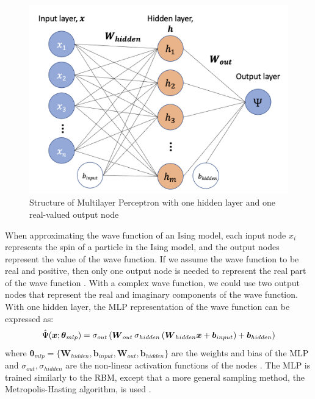 \begin{figure}[htb!]
    \centering
    \includegraphics[width=0.7\linewidth]{images/mlp_diagram.png}
    \caption{Structure of Multilayer Perceptron with one hidden layer and one real-valued output node}
    \label{rbmstructure}
\end{figure}
When approximating the wave function of an Ising model, each input node $x_i$ represents the spin of a particle in the Ising model, and the output nodes represent the value of the wave function. If we assume the wave function to be real and positive, then only one output node is needed to represent the real part of the wave function \cite{b20}. With a complex wave function, we could use two output nodes that represent the real and imaginary components of the wave function. With one hidden layer, the MLP representation of the wave function can be expressed as:
\begin{equation}
    \Hat{\Psi}(\boldsymbol{x}; \boldsymbol{\theta}_{mlp}) = 
    \sigma_{out} \left(
    \boldsymbol{W}_{out} \hspace{2px}
    \sigma_{hidden} \left( \boldsymbol{W}_{hidden}\boldsymbol{x} + \boldsymbol{b}_{input} \right) + \boldsymbol{b}_{hidden} \right)
\end{equation}
where  $\boldsymbol{\theta}_{mlp} = \{\boldsymbol{W}_{hidden}, \boldsymbol{b}_{input}, \boldsymbol{W}_{out}, \boldsymbol{b}_{hidden}\}$ are the weights and bias of the MLP and $\sigma_{out}, \sigma_{hidden}$ are the non-linear activation functions of the nodes \cite{b20}. The MLP is trained similarly to the RBM, except that a more general sampling method, the Metropolis-Hasting algorithm, is used \cite{b25}.

